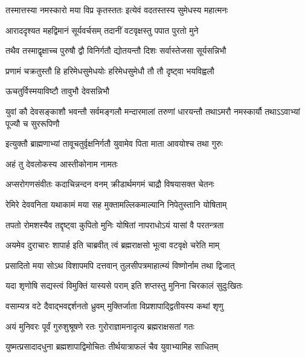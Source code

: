 \twolineshloka
{तस्मात्तस्या नमस्कारो मया विप्र कृतस्ततः}
{इत्येवं वदतस्तस्य सुमेधस्य महात्मनः} %

\twolineshloka
{आराददृश्यत महद्विमानं सूर्यवर्चसम्}
{तदानीं वटवृक्षस्तु पपात पुरतो मुने} %

\twolineshloka
{तथैव तस्माद्वृक्षाच्च पुरुषौ द्वौ विनिर्गतौ}
{द्योतयन्तौ दिशः सर्वास्तेजसा सूर्यसन्निभौ} %

\twolineshloka
{प्रणामं चक्रतुस्तौ हि हरिमेधसुमेधयोः}
{हरिमेधसुमेधौ तौ तौ दृष्ट्वा भयविह्वलौ} %


\onelineshloka
{ऊचतुर्विस्मयाविष्टौ तावुभौ देवसन्निभौ} %



\threelineshloka
{युवां कौ देवसङ्काशौ भवन्तौ सर्वमङ्गलौ}
{मन्दारमालां तरुणां धारयन्तौ तथाऽमरौ}
{नमस्कार्यौ तथाऽऽवाभ्यां पूज्यौ च सुररूपिणौ} %

\twolineshloka
{इत्युक्तौ ब्राह्मणाभ्यां तावूचतुर्वृक्षनिर्गतौ}
{युवामेव पिता माता आवयोश्च तथा गुरुः} %




\onelineshloka
{अहं तु देवलोकस्य आस्तीकोनाम नामतः} %

\twolineshloka
{अप्सरोगणसंवीतः कदाचिन्नन्दन वनम्}
{क्रीडार्थमगमं चाद्रौ विषयासक्त चेतनः} %

\twolineshloka
{रेमिरे देववनिता यथाकामं मया सह}
{मुक्तामल्लिकमाल्यानि निपेतुस्तानि योषिताम्} %

\twolineshloka
{तपतो रोमशस्यैव तद्दृष्ट्वा कुपितो मुनिः}
{योषितां नापराधोऽयं यासां वै परतन्त्रता} %

\twolineshloka
{अयमेव दुराचारः शापार्ह इति चाब्रवीत्}
{त्वं ब्रह्मराक्षसो भूत्वा वटवृक्षे चरेति माम्} %

\twolineshloka
{प्रसादितो मया सोऽथ विशापमपि दत्तवान्}
{तुलसीपत्रमाहात्म्यं विष्णोर्नाम तथा द्विजात्} %

\twolineshloka
{यदा शृणोषि सद्यस्त्वं विमुक्तिं यास्यसे पराम्}
{इति शप्तस्तु मुनिना चिरकालं सुदुःखितः} %

\twolineshloka
{वसाम्यत्र वटे दैवाद्भवद्दर्शनतो ध्रुवम्}
{मुक्तिर्जाता विप्रशापाद्द्वितीयस्य कथां शृणु} %

\twolineshloka
{अयं मुनिवरः पूर्वं गुरुशुश्रूषणे रतः}
{गुरोराज्ञामनादृत्य ब्रह्मराक्षसतां गतः} %

\twolineshloka
{युष्मत्प्रसादादधुना ब्रह्मशापाद्विमोचितः}
{तीर्थयात्राफलं चैव युवाभ्यामिह साधितम्} %

